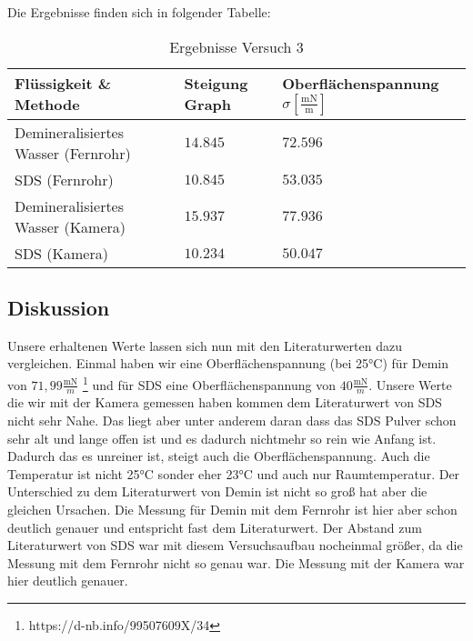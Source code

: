             Die Ergebnisse finden sich in folgender Tabelle:

            \begin{table}[H]
                \centering
                \caption{Ergebnisse Versuch 3}
                \label{tab:Versuch3_Ergebnisse}
                \vspace{0.8em}
                \begin{tabular}{|l|l|l|}
                    \hline
                    Flüssigkeit \& Methode & Steigung Graph & Oberflächenspannung $\sigma \mathrm{\left[\frac{mN}{m}\right]}$\\
                    \hline \hline
                    Demineralisiertes Wasser (Fernrohr) & $14.845$ & $72.596$\\
                    \hline
                    SDS (Fernrohr) & $10.845$ & $53.035$\\
                    \hline
                    Demineralisiertes Wasser (Kamera) & $15.937$ & $77.936$\\
                    \hline
                    SDS (Kamera) & $10.234$ & $50.047$\\
                    \hline
                \end{tabular}
            \end{table}

        \subsection{Diskussion}

            Unsere erhaltenen Werte lassen sich nun mit den Literaturwerten dazu vergleichen. Einmal haben wir eine Oberflächenspannung (bei 25°C) für Demin von $71,99 \frac{\mathrm{mN}}{m}$ \footnote{https://d-nb.info/99507609X/34} und für SDS eine Oberflächenspannung von $40 \frac{\mathrm{mN}}{m}$. Unsere Werte die wir mit der Kamera gemessen haben kommen dem Literaturwert von SDS nicht sehr Nahe. Das liegt aber unter anderem daran dass das SDS Pulver schon sehr alt und lange offen ist und es dadurch nichtmehr so rein wie Anfang ist. Dadurch das es unreiner ist, steigt auch die Oberflächenspannung. Auch die Temperatur ist nicht 25°C sonder eher 23°C und auch nur Raumtemperatur. Der Unterschied zu dem Literaturwert von Demin ist nicht so groß hat aber die gleichen Ursachen. Die Messung für Demin mit dem Fernrohr ist hier aber schon deutlich genauer und entspricht fast dem Literaturwert. Der Abstand zum Literaturwert von SDS war mit diesem Versuchsaufbau nocheinmal größer, da die Messung mit dem Fernrohr nicht so genau war. Die Messung mit der Kamera war hier deutlich genauer.